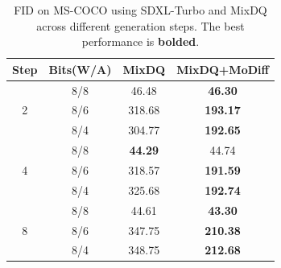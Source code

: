 \begin{table}[h!]
\centering
\caption{FID on MS-COCO using SDXL-Turbo and MixDQ across different generation steps. The best performance is \textbf{bolded}.}
\begin{tabular}{c|c|c|c}
\toprule
{Step} & {Bits(W/A)} & {MixDQ} & {MixDQ+MoDiff} \\
\midrule
\multirow{3}{*}{2} 
& 8/8 & 46.48 & \textbf{46.30} \\
& 8/6 & 318.68 & \textbf{193.17} \\
& 8/4 & 304.77 & \textbf{192.65} \\
\midrule
\multirow{3}{*}{4} 
& 8/8 & \bf 44.29 & {44.74} \\
& 8/6 & 318.57 & \textbf{191.59} \\
& 8/4 & 325.68 & \textbf{192.74} \\
\midrule
\multirow{3}{*}{8} 
& 8/8 & 44.61 & \textbf{43.30} \\
& 8/6 & 347.75 & \textbf{210.38} \\
& 8/4 & 348.75 & \textbf{212.68} \\
\bottomrule
\end{tabular}
\label{tab:mixdq}
\end{table}